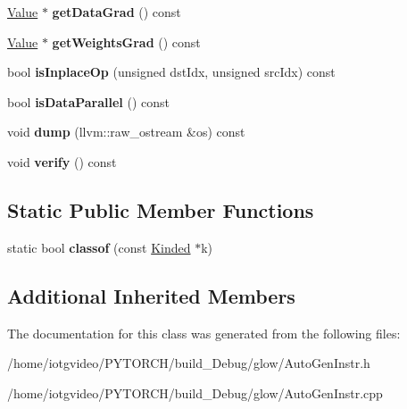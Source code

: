 \begin{DoxyCompactItemize}
\item 
\mbox{\label{classglow_1_1_sparse_lengths_weighted_sum_grad_inst_a6c8138a250d77a43e23304c0b10b5635}} 
\hyperlink{classglow_1_1_value}{Value} $\ast$ {\bfseries get\+Data\+Grad} () const
\item 
\mbox{\label{classglow_1_1_sparse_lengths_weighted_sum_grad_inst_adbe2c4af869ef38c9f9a5f479de85175}} 
\hyperlink{classglow_1_1_value}{Value} $\ast$ {\bfseries get\+Weights\+Grad} () const
\item 
\mbox{\label{classglow_1_1_sparse_lengths_weighted_sum_grad_inst_ae0205e59a05b94b4622190c8d1974029}} 
bool {\bfseries is\+Inplace\+Op} (unsigned dst\+Idx, unsigned src\+Idx) const
\item 
\mbox{\label{classglow_1_1_sparse_lengths_weighted_sum_grad_inst_afbc6722096477b5f6bc8eab15bfce68f}} 
bool {\bfseries is\+Data\+Parallel} () const
\item 
\mbox{\label{classglow_1_1_sparse_lengths_weighted_sum_grad_inst_a6365ec2b7345d86fdeb0792cc5c72b6f}} 
void {\bfseries dump} (llvm\+::raw\+\_\+ostream \&os) const
\item 
\mbox{\label{classglow_1_1_sparse_lengths_weighted_sum_grad_inst_aaaa11927a752092bec9e53d0995b93dc}} 
void {\bfseries verify} () const
\end{DoxyCompactItemize}
\subsection*{Static Public Member Functions}
\begin{DoxyCompactItemize}
\item 
\mbox{\label{classglow_1_1_sparse_lengths_weighted_sum_grad_inst_a9f754f7e93fa1f05e511626fe6b08ae1}} 
static bool {\bfseries classof} (const \hyperlink{classglow_1_1_kinded}{Kinded} $\ast$k)
\end{DoxyCompactItemize}
\subsection*{Additional Inherited Members}


The documentation for this class was generated from the following files\+:\begin{DoxyCompactItemize}
\item 
/home/iotgvideo/\+P\+Y\+T\+O\+R\+C\+H/build\+\_\+\+Debug/glow/Auto\+Gen\+Instr.\+h\item 
/home/iotgvideo/\+P\+Y\+T\+O\+R\+C\+H/build\+\_\+\+Debug/glow/Auto\+Gen\+Instr.\+cpp\end{DoxyCompactItemize}
